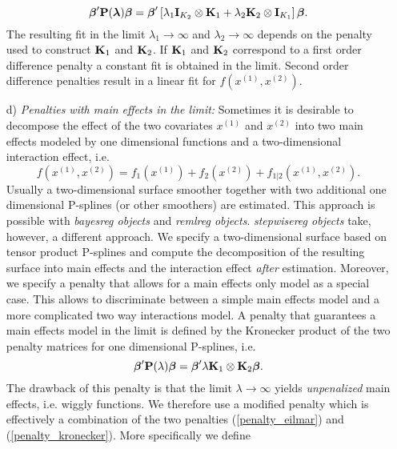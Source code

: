 \documentclass[11pt,a4paper,twoside]{bayesxarticle}
\begin{document}
\begin{enumerate}
\begin{equation}
\label{penalty_eilmar}
 \betavec'\Pvec(\lambdavec) \betavec = \betavec'\left[\lambda_1 \Ivec_{K_2}\otimes\Kvec_1 + \lambda_2 \Kvec_2\otimes \Ivec_{K_1}\right]\betavec.
\end{equation}
The resulting fit in the limit $\lambda_1 \rightarrow \infty$ and
$\lambda_2 \rightarrow \infty$ depends on the penalty used to
construct $\mathbf{K}_1$ and $\mathbf{K}_2$. If $\mathbf{K}_1$ and $\mathbf{K}_2$
correspond to a first order difference penalty a constant fit is
obtained in the limit. Second order difference penalties result in a
linear fit for $f\left(x^{(1)},x^{(2)}\right)$.
\item[d)] {\em Penalties with main effects in the limit:} Sometimes it is desirable to decompose the effect of the two covariates
$x^{(1)}$ and $x^{(2)}$ into two main effects modeled by one
dimensional functions and a two-dimensional interaction effect, i.e.
\begin{equation}
\label{pspline_2dimtermmain} f \left(x^{(1)},x^{(2)}\right) =
f_1\left(x^{(1)} \right) + f_2 \left(x^{(2)}\right) + f_{1|2}\left(
x^{(1)},x^{(2)} \right).
\end{equation}
Usually a two-dimensional surface smoother  together with two
additional  one dimensional P-splines (or other smoothers) are
estimated. This approach is possible with {\em bayesreg objects} and
{\em remlreg objects}. {\em stepwisereg objects} take, however, a
different approach. We specify a two-dimensional surface based on
tensor product P-splines and compute the decomposition of the
resulting surface into main effects and the interaction effect {\em
after} estimation. Moreover, we specify a penalty that allows for a
main effects only model as a special case. This allows to
discriminate between a simple  main effects model and a more
complicated two way interactions model. A penalty that guarantees  a
main effects model in the limit is defined by the Kronecker product
of the two penalty matrices for one dimensional P-splines, i.e.
\begin{equation}
\label{penalty_kronecker}
\betavec'\Pvec(\lambda)\betavec = \betavec' \lambda \Kvec_1 \otimes \Kvec_2 \betavec.
\end{equation}
The drawback of this penalty is that the limit $\lambda \rightarrow \infty $ yields {\em unpenalized} main effects, i.e. wiggly functions.
We therefore use a modified penalty which is effectively a combination of the two  penalties  (\ref{penalty_eilmar}) and
(\ref{penalty_kronecker}). More specifically
we define
\begin{equation}

\end{equation}
\end{enumerate}
\end{document}
